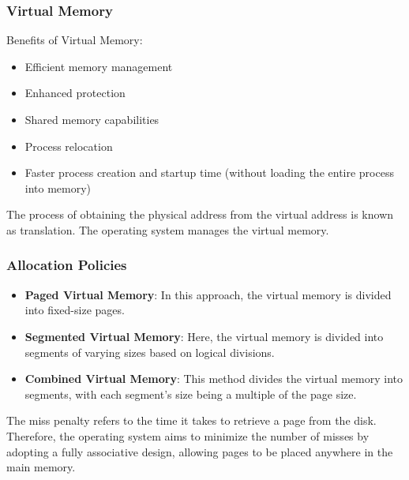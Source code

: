 \begin{frame}
    \frametitle{Virtual Memory}
    Benefits of Virtual Memory:
    \begin{itemize}
        \item Efficient memory management
        \item Enhanced protection
        \item Shared memory capabilities
        \item Process relocation
        \item Faster process creation and startup time (without loading the entire process into memory)
    \end{itemize}
    
    The process of obtaining the physical address from the virtual address is known as translation.
    The operating system manages the virtual memory.
\end{frame}

\begin{frame}
    \frametitle{Allocation Policies}
    \begin{itemize}
        \item\textbf{Paged Virtual Memory}: In this approach, the virtual memory is divided into fixed-size pages.
        \item \textbf{Segmented Virtual Memory}: Here, the virtual memory is divided into segments of varying sizes
        based on logical divisions.
        \item \textbf{Combined Virtual Memory}: This method divides the virtual memory into segments, with each segment's
        size being a multiple of the page size.
    \end{itemize}
    The miss penalty refers to the time it takes to retrieve a page from the disk. Therefore, the operating system
    aims to minimize the number of misses by adopting a fully associative design, allowing pages to be placed
    anywhere in the main memory.
\end{frame}

